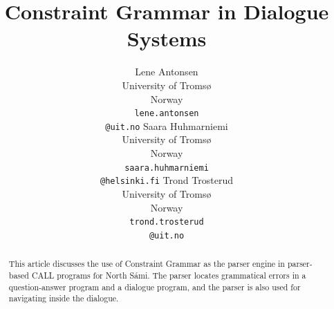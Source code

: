 \documentclass[11pt]{article}
\begin{document}
\title{Constraint Grammar in Dialogue Systems}

\author{Lene Antonsen\\
  University of Tromsø\\
  Norway\\
  {\tt lene.antonsen}\\{\tt @uit.no}  \And
  Saara Huhmarniemi\\
  University of Tromsø\\
  Norway\\
  {\tt saara.huhmarniemi}\\{\tt @helsinki.fi}  \And
  Trond Trosterud\\
  University of Tromsø\\
  Norway\\
  {\tt trond.trosterud}\\{\tt @uit.no}}



\maketitle
{}


 
\maketitle

\begin{abstract}
This article discusses the use of Constraint Grammar as the parser engine in parser-based CALL programs for North Sámi. The parser locates grammatical errors in a question-answer program and a dialogue program, and the parser is also used for navigating inside the dialogue.

\end{abstract}
\end{document}
